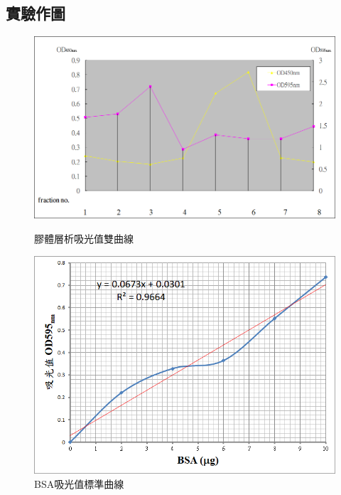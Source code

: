 \subsection*{實驗作圖}

\begin{figure}[H]
\centering
\includegraphics[width=.8\textwidth]{paste_src/2023-10-18-22-15-33.png}
\caption{膠體層析吸光值雙曲線}
\label{fig:gel_filtration}
\vspace{1em}
\includegraphics[width=.8\textwidth]{paste_src/2023-10-18-22-23-08.png}
\caption{BSA吸光值標準曲線}
\label{fig:stand_curve}
\end{figure}



\newpage
